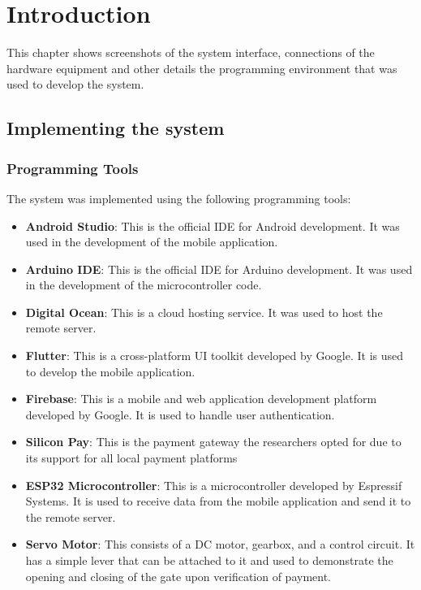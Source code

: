 \section{Introduction}\label{sec:introduction}
This chapter shows screenshots of the system interface, connections of the hardware equipment and other details the programming environment that was used to develop the system.

\subsection{Implementing the system}

\subsubsection{Programming Tools}
The system was implemented using the following programming tools:
\begin{itemize}
    \item \textbf{Android Studio}: This is the official IDE for Android development. It was used in the development of the mobile application.
    \item \textbf{Arduino IDE}: This is the official IDE for Arduino development. It was used in the development of the microcontroller code.
    \item \textbf{Digital Ocean}: This is a cloud hosting service. It was used to host the remote server.
    \item \textbf{Flutter}: This is a cross-platform UI toolkit developed by Google. It is used to develop the mobile application.
    \item \textbf{Firebase}: This is a mobile and web application development platform developed by Google. It is used to handle user authentication.
    \item \textbf{Silicon Pay}: This is the payment gateway the researchers opted for due to its support for all local payment platforms
    \item \textbf{ESP32 Microcontroller}: This is a microcontroller developed by Espressif Systems. It is used to receive data from the mobile application and send it to the remote server.
    \item \textbf{Servo Motor}: This consists of a DC motor, gearbox, and a control circuit. It has a simple lever that can be attached to it and used to demonstrate the opening and closing of the gate upon verification of payment.
\end{itemize}

